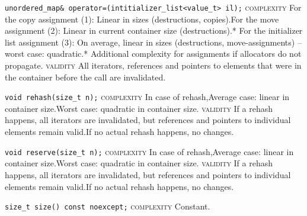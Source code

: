 \noindent{}\hspace*{0.25em}\lstinline[basicstyle=\ttfamily\color{corange}]{unordered_map& operator=(intitializer_list<value_t> il);} \textsc{complexity} For the copy assignment (1): Linear in sizes (destructions, copies).For the move assignment (2): Linear in current container size (destructions).* For the initializer list assignment (3): On average, linear in sizes (destructions, move-assignments) -- worst case: quadratic.* Additional complexity for assignments if allocators do not propagate. \textsc{validity} All iterators, references and pointers to elements that were in the container before the call are invalidated.\\\vspace{-0.6em}

\noindent{}\hspace*{0.25em}\lstinline[basicstyle=\ttfamily\color{corange}]{void rehash(size_t n);} \textsc{complexity} In case of rehash,Average case: linear in container size.Worst case: quadratic in container size. \textsc{validity} If a rehash happens, all iterators are invalidated, but references and pointers to individual elements remain valid.If no actual rehash happens, no changes.\\\vspace{-0.6em}

\noindent{}\hspace*{0.25em}\lstinline[basicstyle=\ttfamily\color{corange}]{void reserve(size_t n);} \textsc{complexity} In case of rehash,Average case: linear in container size.Worst case: quadratic in container size. \textsc{validity} If a rehash happens, all iterators are invalidated, but references and pointers to individual elements remain valid.If no actual rehash happens, no changes.\\\vspace{-0.6em}

\noindent{}\hspace*{0.25em}\lstinline[basicstyle=\ttfamily\color{cgreen}]{size_t size() const noexcept;} \textsc{complexity} Constant.\\\vspace{-0.6em}

